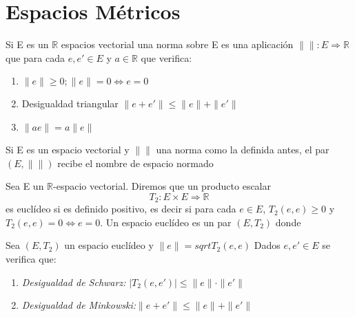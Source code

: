 \chapter{Espacios Métricos}

\begin{defi}
Si E es un $\mathbb{R}$ espacios vectorial una norma sobre E es una aplicación $\parallel\parallel\colon E \Longrightarrow \mathbb{R}$ que para cada $e,e'\in E$ y $a\in \mathbb{R}$ que verifica:
\begin{enumerate}
\item $\parallel e \parallel \geq 0; \parallel e\parallel=0 \Leftrightarrow e=0$
\item Desigualdad triangular $\parallel e +e'\parallel\leq \parallel e \parallel +\parallel e' \parallel$
\item $\parallel ae \parallel=a\parallel e \parallel$
\end{enumerate}
Si E es un espacio vectorial y $\parallel \parallel$ una norma como la definida antes, el par $(E,\parallel \parallel)$ recibe el nombre de espacio normado 
\end{defi}

\begin{defi}
Sea E un $\mathbb{R}$-espacio vectorial. Diremos que un producto escalar $$T_2\colon E\times E \Longrightarrow \mathbb{R}$$ es euclídeo si es definido positivo, es decir si para cada $e \in E$, $T_2(e,e)\geq 0$ y $T_2(e,e)=0\Leftrightarrow e=0$. Un espacio euclídeo es un par $(E,T_2)$ donde 
\end{defi}

\begin{lemma}
Sea $(E,T_2)$ un espacio euclídeo y $\parallel e \parallel=sqrt{T_2(e,e)}$ Dados $e,e' \in E$ se verifica que:
\begin{enumerate}
\item \emph{Desigualdad de Schwarz:} $|T_2(e,e')|\leq \parallel e \parallel \cdot \parallel e' \parallel$
\item \emph{Desigualdad de Minkowski:}$\parallel e+e' \parallel \leq \parallel e\parallel +\parallel e' \parallel$

\end{enumerate}
\end{lemma}

